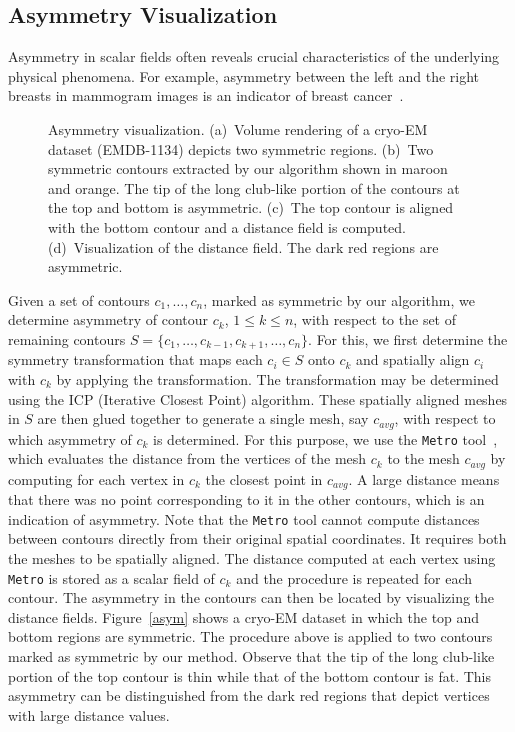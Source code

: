 \documentclass[review,journal]{vgtc}         %
\begin{document}
\subsection{Asymmetry Visualization}
Asymmetry in scalar fields often reveals crucial characteristics of the underlying
physical phenomena. For example, asymmetry between 
the left and the right breasts in mammogram images is an indicator of breast 
cancer~\cite{tahmoush2007improved}.
\begin{figure*}[t]
	\centering
	\caption{Asymmetry visualization. (a)~Volume rendering of a cryo-EM dataset (EMDB-1134) 
	depicts two symmetric regions. (b)~Two symmetric contours extracted by our algorithm shown
in maroon and orange. The tip of the long club-like portion of the contours at the top and bottom is asymmetric.
(c)~The top contour is aligned with the bottom contour and a distance field is computed. (d)~Visualization
of the distance field. The dark red regions are asymmetric.}
\end{figure*}
Given a set of contours $c_1,\dots,c_n$, marked as symmetric
by our algorithm, we determine asymmetry of contour $c_k$, $1 \leq k \leq n$, with
respect to the set of remaining contours $S = \{c_1, \dots, c_{k-1}, c_{k+1}, \dots, c_n\}$.
For this, we first determine the symmetry transformation that maps each $c_i \in S$ onto
$c_k$ and spatially align $c_i$ with $c_k$ by applying the transformation. 
The transformation may be determined using the ICP (Iterative Closest Point) algorithm.
These spatially aligned meshes in $S$ are then glued together to generate a single mesh, say $c_{avg}$, 
with respect to which asymmetry of $c_k$ is determined. For this purpose, we use the 
\texttt{Metro} tool~\cite{CigRS98}, which evaluates the distance from the vertices of the mesh 
$c_k$ to the mesh $c_{avg}$ by computing for each vertex in $c_k$ the closest point in $c_{avg}$. 
A large distance means that there was no point corresponding to it in the other contours,
which is an indication of asymmetry. Note that the \texttt{Metro} tool cannot compute distances 
between contours directly from their original spatial coordinates. 
It requires both the meshes to be spatially aligned. 
The distance computed at each vertex using \texttt{Metro} is stored as a scalar field of 
$c_k$ and the procedure is repeated
for each contour. The asymmetry in the contours can then be located by visualizing the distance fields.
Figure~\ref{asym} shows a cryo-EM dataset in which the top and bottom regions are symmetric. The procedure
above is applied to two contours marked as symmetric by our method. Observe that the tip of the long
club-like portion of the top contour is thin while that of the bottom contour is fat. This asymmetry
can be distinguished from the dark red regions that depict vertices with large distance values.
\end{document}
